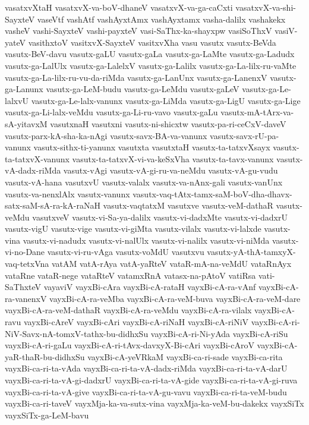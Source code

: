 {vasatxvXtaH
vasatxvX-va-boV-dhaneV
vasatxvX-va-ga-caCxti
vasatxvX-va-shi-SayxteV
vaseVtf
vashAtf
vashAyxtAmx
vashAyxtamx
vasha-dalilx
vashakekx
vasheV
vashi-SayxteV
vashi-payxteV
vasi-SaThx-ka-shayxpw
vasiSoThxV
vasiV-yateV
vasithxtoV
vasitxvX-SayxteV
vasitxvXha
vasu
vasutx
vasutx-BeVda
vasutx-BeV-davu
vasutx-gaLU
vasutx-gaLa
vasutx-ga-LaMte
vasutx-ga-Ladudx
vasutx-ga-LalUlx
vasutx-ga-LalelxV
vasutx-ga-Lalilx
vasutx-ga-La-lilx-ru-vaMte
vasutx-ga-La-lilx-ru-vu-da-riMda
vasutx-ga-LanUnx
vasutx-ga-LanenxV
vasutx-ga-Lanunx
vasutx-ga-LeM-budu
vasutx-ga-LeMdu
vasutx-gaLeV
vasutx-ga-Le-lalxvU
vasutx-ga-Le-lalx-vanunx
vasutx-ga-LiMda
vasutx-ga-LigU
vasutx-ga-Lige
vasutx-ga-Li-lalx-veMdu
vasutx-ga-Li-ru-vavo
vasutx-gaLu
vasutx-mA-tArx-va-sA-yitavxM
vasutxnaH
vasutxni
vasutx-ni-shicxtw
vasutx-pa-ri-ceCxV-daveV
vasutx-parx-kA-sha-ka-nAgi
vasutx-savx-BA-va-vanunx
vasutx-savx-rU-pa-vanunx
vasutx-sithx-ti-yanunx
vasutxta
vasutxtaH
vasutx-ta-tatxvXsayx
vasutx-ta-tatxvX-vanunx
vasutx-ta-tatxvX-vi-va-keSxVha
vasutx-ta-tavx-vanunx
vasutx-vA-dadx-riMda
vasutx-vAgi
vasutx-vA-gi-ru-va-neMdu
vasutx-vA-gu-vudu
vasutx-vA-hana
vasutxvU
vasutx-valalx
vasutx-va-nAnx-gali
vasutx-vanUnx
vasutx-va-nenxlAlx
vasutx-vanunx
vasutx-vaq-tAtx-tamx-saM-boV-dha-dhavx-satx-saM-sA-ra-kA-raNaH
vasutx-vaqtatxM
vasutxve
vasutx-veM-dathaR
vasutx-veMdu
vasutxveV
vasutx-vi-Sa-ya-dalilx
vasutx-vi-dadxMte
vasutx-vi-dadxrU
vasutx-vigU
vasutx-vige
vasutx-vi-giMta
vasutx-vilalx
vasutx-vi-lalxde
vasutx-vina
vasutx-vi-nadudx
vasutx-vi-nalUlx
vasutx-vi-nalilx
vasutx-vi-niMda
vasutx-vi-no-Dane
vasutx-vi-ru-vAga
vasutx-voMdU
vasutxvu
vasutx-yA-thA-tamxyX-vaq-tetxVna
vatAM
vatA-rAya
vatA-yaRteV
vataR-mA-na-veMdU
vataRnAyx
vataRne
vataR-nege
vataRteV
vatamxRnA
vatasx-na-pAtoV
vatiRsa
vati-SaThxteV
vayaviV
vayxBi-cAra
vayxBi-cA-rataH
vayxBi-cA-ra-vAnf
vayxBi-cA-ra-vanenxV
vayxBi-cA-ra-veMba
vayxBi-cA-ra-veM-buva
vayxBi-cA-ra-veM-dare
vayxBi-cA-ra-veM-dathaR
vayxBi-cA-ra-veMdu
vayxBi-cA-ra-vilalx
vayxBi-cA-ravu
vayxBi-cAreV
vayxBi-cAri
vayxBi-cA-riNaH
vayxBi-cA-riNiV
vayxBi-cA-ri-NiV-Savx-nA-tomxV-tathx-bu-didhxSu
vayxBi-cA-ri-Ni-yAda
vayxBi-cA-riSu
vayxBi-cA-ri-gaLu
vayxBi-cA-ri-tAvx-davxyX-Bi-cAri
vayxBi-cAroV
vayxBi-cA-yaR-thaR-bu-didhxSu
vayxBi-cA-yeVRkaM
vayxBi-ca-ri-sade
vayxBi-ca-rita
vayxBi-ca-ri-ta-vAda
vayxBi-ca-ri-ta-vA-dadx-riMda
vayxBi-ca-ri-ta-vA-darU
vayxBi-ca-ri-ta-vA-gi-dadxrU
vayxBi-ca-ri-ta-vA-gide
vayxBi-ca-ri-ta-vA-gi-ruva
vayxBi-ca-ri-ta-vA-give
vayxBi-ca-ri-ta-vA-gu-vavu
vayxBi-ca-ri-ta-veM-budu
vayxBi-ca-ri-taveV
vayxMja-ka-va-sutx-vina
vayxMja-ka-veM-bu-dakekx
vayxSiTx
vayxSiTx-ga-LeM-bavu
}
